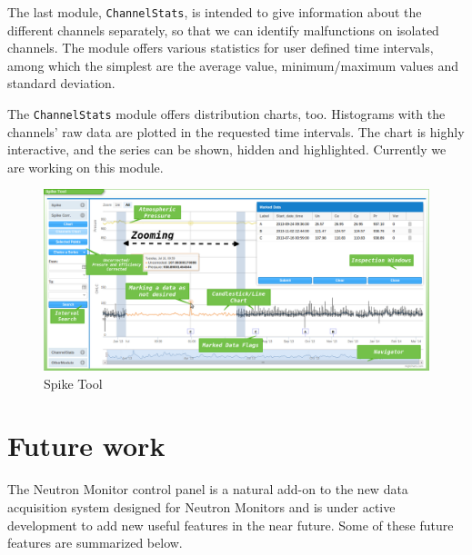 \documentclass[a4paper]{jpconf}
\begin{document}
The last module, \texttt{ChannelStats}, is intended to give information about the
different channels separately, so that we can identify malfunctions on isolated
channels. The module offers various statistics for user defined time intervals,
among which the simplest are the average value, minimum/maximum
values and standard deviation.

The \texttt{ChannelStats} module offers distribution charts, too. Histograms with the
channels' raw data are plotted in the requested time intervals. The chart is
highly interactive, and the series can be shown, hidden and highlighted. Currently
we are working on this module.

\begin{figure}[h]
    \centering
    \includegraphics[keepaspectratio, width=1\textwidth]{./resources/SpikeTool.png}
    \caption{Spike Tool}
    \label{fig:SpikeTool}
\end{figure}

\section{Future work}

The Neutron Monitor control panel is a natural add-on to the new data
acquisition system designed for Neutron Monitors and is under active
development to add new useful features in the near future. Some of these future
features are summarized below.
\end{document}
